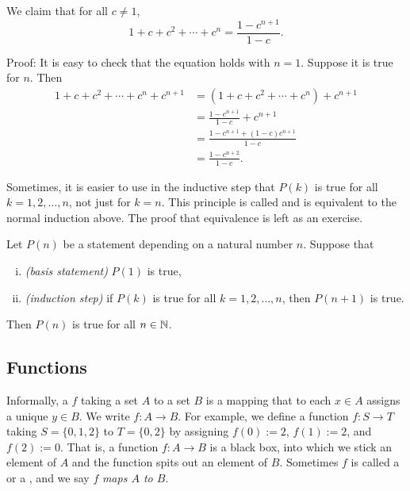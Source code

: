 \begin{example} \label{example:geometricsum}
We claim that for all $c \not= 1$,
\begin{equation*}
1 + c + c^2 + \cdots + c^n = \frac{1-c^{n+1}}{1-c} .
\end{equation*}

Proof: It is easy to check that the equation holds with $n=1$.  Suppose 
it is true for $n$.  Then
\begin{equation*}
\begin{split}
1 + c + c^2 + \cdots + c^n + c^{n+1} & =
( 1 + c + c^2 + \cdots + c^n ) + c^{n+1} \\
& = \frac{1-c^{n+1}}{1-c}  + c^{n+1} \\
& = \frac{1-c^{n+1}  + (1-c)c^{n+1}}{1-c} \\
& = \frac{1-c^{n+2}}{1-c} .
\end{split}
\end{equation*}
\end{example}

Sometimes, it is easier to use in the inductive step
that $P(k)$ is true for all $k = 1,2,\ldots,n$, not just for $k=n$.
This principle is called \emph{} and is equivalent
to the normal induction above.  The proof that
equivalence is left as an exercise.

\begin{thm}
Let $P(n)$ be a statement depending on a natural number $n$.  Suppose that
\begin{enumerate}[(i)]
\item \emph{(basis statement)} $P(1)$ is true,
\item \emph{(induction step)} if $P(k)$ is true for all $k = 1,2,\ldots,n$, then $P(n+1)$ is true.
\end{enumerate}
Then $P(n)$ is true for all $n \in {\mathbb{N}}$.
\end{thm}

\subsection{Functions}

Informally,
a \emph{}
$f$ taking a set $A$ to a set $B$
is a mapping that to each $x \in A$ assigns a unique $y \in B$.  We write
$f \colon A \to B$.  For example, we
define a function $f \colon S \to T$ taking $S = \{ 0, 1, 2 \}$ to $T = \{ 0, 2 \}$
by assigning $f(0) := 2$, $f(1) := 2$, and $f(2) := 0$.  That is, a function $f
\colon A \to B$ is
a black box, into which we stick an element of $A$ and the function
spits out an element of $B$.
Sometimes $f$ is called a \emph{} or a
\emph{},
and we say $f$ \emph{maps $A$ to $B$}.


